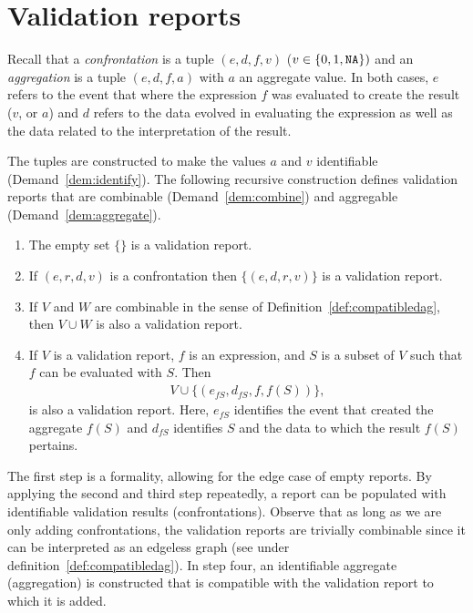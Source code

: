 \section{Validation reports}
\label{sect:basicreports}
Recall that a \emph{confrontation} is a tuple $(e,d,f,v)$ ($v\in\{0,1,{\normalfont \texttt{NA}}{}\})$
and an \emph{aggregation} is a tuple $(e,d,f,a)$ with $a$ an aggregate value.
In both cases, $e$ refers to the event that where the expression $f$ was
evaluated to create the result ($v$, or $a$) and $d$ refers to the data evolved
in evaluating the expression as well as the data related to the interpretation
of the result. 

The tuples are constructed to make  the values $a$ and $v$ identifiable
(Demand~\ref{dem:identify}).  The following recursive construction defines
validation reports that are combinable (Demand~\ref{dem:combine}) and
aggregable (Demand~\ref{dem:aggregate}).
%
\begin{definition}\leavevmode
\begin{enumerate}[topsep=0pt,itemsep=0pt]
\item The empty set $\{\}$ is a validation report.
\item If $(e,r,d,v)$ is a confrontation then $\{(e,d,r,v)\}$ is a validation report.
\item If $V$ and $W$ are combinable in the sense of
Definition~\ref{def:compatibledag}, then $V\cup W$ is also a validation report.
\item If $V$ is a validation report, $f$ is an expression, and  $S$ is a subset of $V$  
such that $f$ can be evaluated with $S$. Then 
\begin{align*}
V\cup \{(e_{fS}, d_{fS}, f, f(S))\},
\end{align*}
is also a validation report. Here, $e_{fS}$ identifies the event that created
the aggregate $f(S)$ and $d_{fS}$ identifies $S$ and the data to which the
result $f(S)$ pertains.
\end{enumerate}
\label{def:basicvalidationreport}
\end{definition}
%
The first step is a formality, allowing for the edge case of empty reports.  By
applying the second and third step repeatedly, a report can be populated with
identifiable validation results (confrontations). Observe that as long as we are
only adding confrontations, the validation reports are trivially combinable
since it can be interpreted as an edgeless graph (see under
definition~\ref{def:compatibledag}). In step four, an identifiable aggregate
(aggregation) is constructed that is compatible with the validation report to
which it is added.

